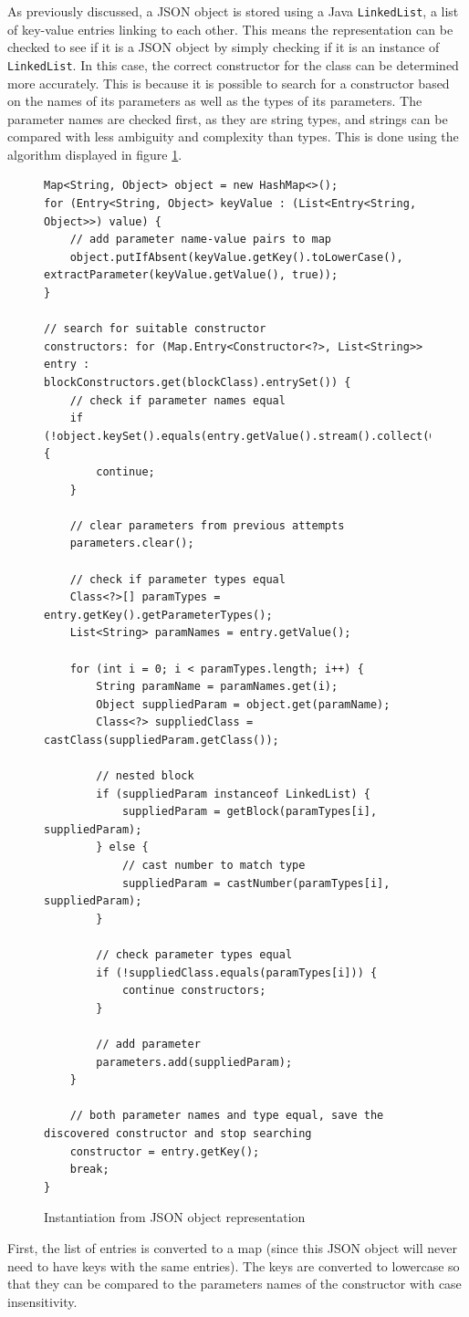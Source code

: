 As previously discussed, a JSON object is stored using a Java \texttt{LinkedList}, a list of key-value entries linking to each other. This means the representation can be checked to see if it is a JSON object by simply checking if it is an instance of \texttt{LinkedList}. In this case, the correct constructor for the class can be determined more accurately. This is because it is possible to search for a constructor based on the names of its parameters as well as the types of its parameters. The parameter names are checked first, as they are string types, and strings can be compared with less ambiguity and complexity than types. This is done using the algorithm displayed in figure  \ref{fig:json_object_to_java_object}.
\begin{figure}
\centering
\caption{Instantiation from JSON object representation}
\label{fig:json_object_to_java_object}
\begin{verbatim}
Map<String, Object> object = new HashMap<>();
for (Entry<String, Object> keyValue : (List<Entry<String, Object>>) value) {
    // add parameter name-value pairs to map
    object.putIfAbsent(keyValue.getKey().toLowerCase(), 
extractParameter(keyValue.getValue(), true));
}

// search for suitable constructor
constructors: for (Map.Entry<Constructor<?>, List<String>> entry : 
blockConstructors.get(blockClass).entrySet()) {
    // check if parameter names equal
    if (!object.keySet().equals(entry.getValue().stream().collect(Collectors.toSet()))) {
        continue;
    }

    // clear parameters from previous attempts
    parameters.clear();

    // check if parameter types equal
    Class<?>[] paramTypes = entry.getKey().getParameterTypes();
    List<String> paramNames = entry.getValue();

    for (int i = 0; i < paramTypes.length; i++) {
        String paramName = paramNames.get(i);
        Object suppliedParam = object.get(paramName);
        Class<?> suppliedClass = castClass(suppliedParam.getClass());

        // nested block
        if (suppliedParam instanceof LinkedList) {
            suppliedParam = getBlock(paramTypes[i], suppliedParam);
        } else {
            // cast number to match type
            suppliedParam = castNumber(paramTypes[i], suppliedParam);
        }

        // check parameter types equal
        if (!suppliedClass.equals(paramTypes[i])) {
            continue constructors;
        }

        // add parameter
        parameters.add(suppliedParam);
    }

    // both parameter names and type equal, save the discovered constructor and stop searching
    constructor = entry.getKey();
    break;
}
\end{verbatim}
\end{figure}
First, the list of entries is converted to a map (since this JSON object will never need to have keys with the same entries). The keys are converted to lowercase so that they can be compared to the parameters names of the constructor with case insensitivity.\par

